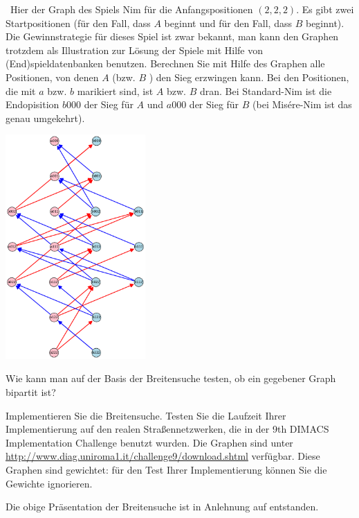 \begin{aufg}\ Hier der Graph des Spiels Nim für die Anfangspositionen $(2,2,2)$. Es gibt zwei Startpositionen (für den Fall, dass $A$ beginnt und für den Fall, dass $B$ beginnt). Die Gewinnstrategie für dieses Spiel ist zwar bekannt, man kann den Graphen trotzdem als Illustration zur Lösung der Spiele mit Hilfe von (End)spieldatenbanken benutzen. Berechnen Sie mit Hilfe des Graphen alle Positionen, von denen $A$ (bzw. $B$ ) den Sieg erzwingen kann. Bei den Positionen, die mit $a$ bzw. $b$ marikiert sind, ist $A$ bzw. $B$ dran. Bei Standard-Nim ist die Endopisition $b000$ der Sieg für $A$ und $a000$ der Sieg für $B$ (bei Mis\'ere-Nim ist das genau umgekehrt). 
\begin{center}
			\includegraphics[width=0.4\textwidth]{Code/nim_222.pdf}
	\end{center} 
\end{aufg}

\begin{aufg} 
	Wie kann man auf der Basis der Breitensuche testen, ob ein gegebener Graph bipartit ist? 
\end{aufg} 

\begin{aufg}
	Implementieren Sie die Breitensuche. Testen Sie die Laufzeit Ihrer Implementierung auf den realen Straßennetzwerken, die in der 9th DIMACS Implementation Challenge benutzt wurden. Die Graphen sind unter 
	\url{http://www.diag.uniroma1.it/challenge9/download.shtml}  verfügbar. Diese Graphen sind gewichtet: für den Test Ihrer Implementierung können Sie die Gewichte ignorieren. 
\end{aufg} 

\begin{bem}
	Die obige Präsentation der Breitensuche ist in Anlehnung auf \cite{CLRS17} entstanden.
\end{bem} 
